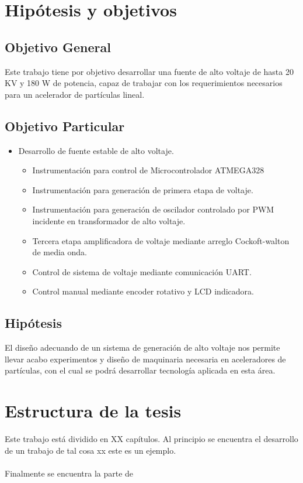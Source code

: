 \section{Hipótesis y objetivos}

\subsection{Objetivo General}

Este trabajo tiene por objetivo desarrollar una fuente de alto voltaje de hasta 20 KV y 180 W de potencia, capaz de trabajar con los requerimientos necesarios para un acelerador de partículas lineal.

\subsection{Objetivo Particular}


\begin{itemize}
\item Desarrollo de fuente estable de alto voltaje.
\begin{itemize}
\item Instrumentación para control de Microcontrolador ATMEGA328
\item Instrumentación para generación de primera etapa de voltaje.
\item Instrumentación para generación de oscilador controlado por PWM incidente en transformador de alto voltaje.
\item Tercera etapa amplificadora de voltaje mediante arreglo Cockoft-walton de media onda.
\item Control de sistema de voltaje mediante comunicación UART.
\item Control manual mediante encoder rotativo y LCD indicadora.
\
\end{itemize}  
\end{itemize}

\subsection{Hipótesis}
El diseño adecuando de un sistema de generación de alto voltaje nos permite llevar acabo experimentos y diseño de maquinaria necesaria en aceleradores de partículas, con el cual se podrá desarrollar tecnología aplicada en esta área.


\section{Estructura de la tesis}

Este trabajo está dividido en XX capítulos. Al principio se encuentra el desarrollo de un trabajo de tal cosa xx este es un ejemplo.
\\\\
Finalmente se encuentra la parte de 